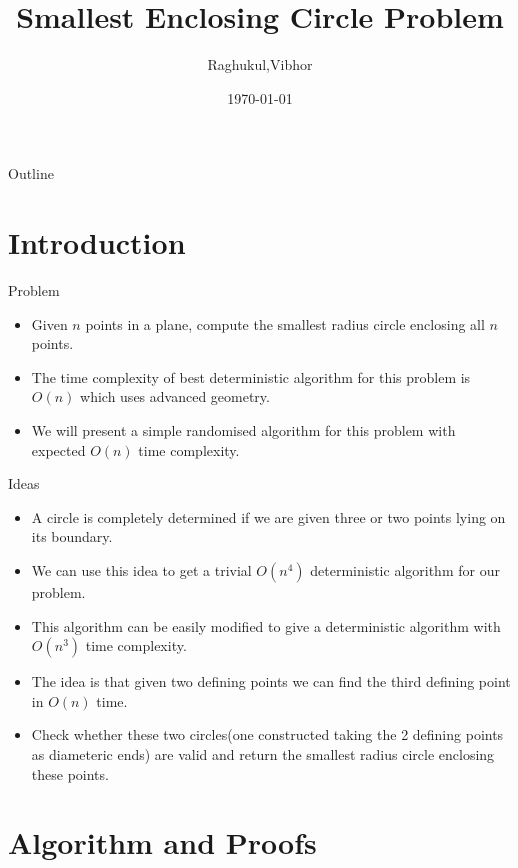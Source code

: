 \documentclass{beamer}
\title[CS648]{Smallest Enclosing Circle Problem}
\author{Raghukul,Vibhor}
\institute{IIT Kanpur}
\date{\today}
\begin{document}
\begin{frame}
  \titlepage
\end{frame}

\begin{frame}{Outline}
  \tableofcontents
\end{frame}

\section{Introduction}

\begin{frame}{Problem}
  \begin{itemize}
      \item Given $n$ points in a plane, compute the smallest radius circle enclosing all $n$ points.
      \pause
      \item The time complexity of best deterministic algorithm for this problem is $O(n)$ which uses advanced geometry.
      \pause 
      \item We will present a simple randomised algorithm for this problem with expected $O(n)$ time complexity. 
      \pause
    \end{itemize}
\end{frame}

\begin{frame}{Ideas}
  \begin{itemize}
      \item A circle is completely determined if we are given three or two points lying on its boundary.
      \pause
      \item We can use this idea to get a trivial $O(n^4)$ deterministic algorithm for our problem.
      \pause
      \item This algorithm can be easily modified to give a deterministic algorithm with $O(n^3)$ time complexity.
      \pause
      \item The idea is that given two defining points we can find the third defining point in $O(n)$ time.
      
      \pause
      \item Check whether these two circles(one constructed taking the 2 defining points as diameteric ends) are valid and return the smallest radius circle enclosing these points.
  \end{itemize}
\end{frame}

\section{Algorithm and Proofs}
\end{document}

